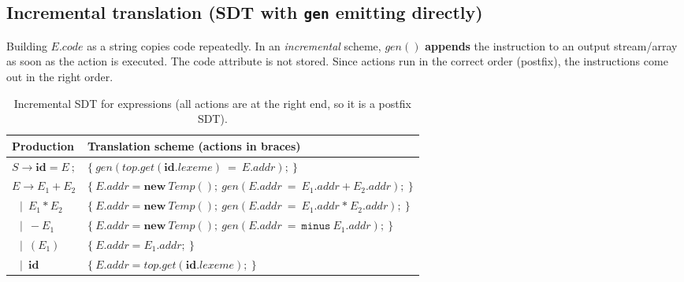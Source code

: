 \documentclass[11pt,a4paper]{article}
\newcommand{\at}[2]{\ensuremath{#1.\mathit{#2}}}
\newcommand{\tok}[1]{\ensuremath{\mathtt{#1}}}
\begin{document}
\subsection{Incremental translation (SDT with \texttt{gen} emitting directly)}
Building \at{E}{code} as a string copies code repeatedly. In an \emph{incremental} scheme, $\mathit{gen}()$ \textbf{appends} the instruction to an output stream/array as soon as the action is executed. The code attribute is not stored. Since actions run in the correct order (postfix), the instructions come out in the right order.

\begin{table}[htbp]
\centering
\small
\begin{tabular}{@{}L{2.6cm} L{12cm}@{}}
\toprule
\textbf{Production} & \textbf{Translation scheme (actions in braces)} \\ \midrule
$S \to \mathbf{id} = E\ ;$ & $\{\ \mathit{gen}(\mathit{top}.\mathit{get}(\at{\mathbf{id}}{lexeme})\ \tok{=}\ \at{E}{addr});\ \}$ \\
$E \to E_1 + E_2$ & $\{\ \at{E}{addr} = \mathbf{new}\ \mathit{Temp}();\ \mathit{gen}(\at{E}{addr}\ \tok{=}\ \at{E_1}{addr}\ \tok{+}\ \at{E_2}{addr});\ \}$ \\
$\ \ \mid\ E_1 * E_2$ & $\{\ \at{E}{addr} = \mathbf{new}\ \mathit{Temp}();\ \mathit{gen}(\at{E}{addr}\ \tok{=}\ \at{E_1}{addr}\ \tok{*}\ \at{E_2}{addr});\ \}$ \\
$\ \ \mid\ -E_1$ & $\{\ \at{E}{addr} = \mathbf{new}\ \mathit{Temp}();\ \mathit{gen}(\at{E}{addr}\ \tok{=}\ \tok{minus}\ \at{E_1}{addr});\ \}$ \\
$\ \ \mid\ (E_1)$ & $\{\ \at{E}{addr} = \at{E_1}{addr};\ \}$ \\
$\ \ \mid\ \mathbf{id}$ & $\{\ \at{E}{addr} = \mathit{top}.\mathit{get}(\at{\mathbf{id}}{lexeme});\ \}$ \\ \bottomrule
\end{tabular}
\caption{Incremental SDT for expressions (all actions are at the right end, so it is a postfix SDT).}
\end{table}
\end{document}

